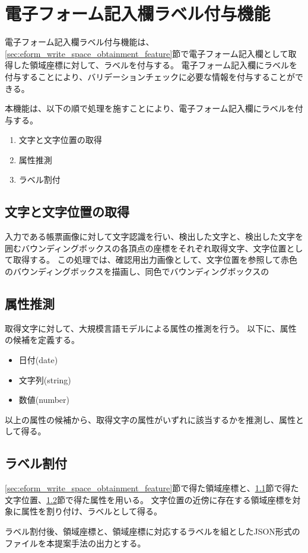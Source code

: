 \section{電子フォーム記入欄ラベル付与機能}\label{sec:label_link}
電子フォーム記入欄ラベル付与機能は、\ref{sec:eform_write_space_obtainment_feature}節で電子フォーム記入欄として取得した領域座標に対して、ラベルを付与する。
電子フォーム記入欄にラベルを付与することにより、バリデーションチェックに必要な情報を付与することができる。

本機能は、以下の順で処理を施すことにより、電子フォーム記入欄にラベルを付与する。

\begin{enumerate}
  \item 文字と文字位置の取得
  \item 属性推測
  \item ラベル割付
\end{enumerate}

\subsection{文字と文字位置の取得}\label{subsec:char_and_bbox_obtainment}
入力である帳票画像に対して文字認識を行い、検出した文字と、検出した文字を囲むバウンディングボックスの各頂点の座標をそれぞれ取得文字、文字位置として取得する。
この処理では、確認用出力画像として、文字位置を参照して赤色のバウンディングボックスを描画し、同色でバウンディングボックスの

\subsection{属性推測}\label{subsec:att_prediction}
取得文字に対して、大規模言語モデルによる属性の推測を行う。
以下に、属性の候補を定義する。

\begin{itemize}
	\item 日付(date)
	\item 文字列(string)
	\item 数値(number)
\end{itemize}

以上の属性の候補から、取得文字の属性がいずれに該当するかを推測し、属性として得る。

\subsection{ラベル割付}\label{subsec:label_link}
\ref{sec:eform_write_space_obtainment_feature}節で得た領域座標と、\ref{subsec:char_and_bbox_obtainment}節で得た文字位置、\ref{subsec:att_prediction}節で得た属性を用いる。
文字位置の近傍に存在する領域座標を対象に属性を割り付け、ラベルとして得る。

ラベル割付後、領域座標と、領域座標に対応するラベルを組としたJSON形式のファイルを本提案手法の出力とする。

